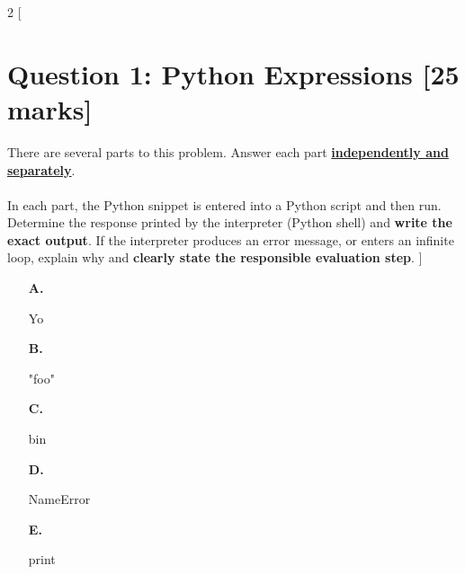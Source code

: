 \begin{multicols*}{2}
[
\section{Question 1: Python Expressions [25 marks]}
There are several parts to this problem. Answer each part \underline{\textbf{independently and separately}}. \\ \\
In each part, the Python snippet is entered into a Python script and then run. Determine the
response printed by the interpreter (Python shell) and \textbf{write the exact output}. 
If the interpreter produces an error message, or enters an infinite loop, explain why and
\textbf{clearly state the responsible evaluation step}.
]
\begin{enumerate}
\item[\textbf{A.}] 
\begin{python}
Yo
\end{python}
\begin{flushright}
    [5 marks]
\end{flushright}

\item[\textbf{B.}]
\begin{python}
"foo"
\end{python}
\begin{flushright}
    [5 marks]
\end{flushright}

\item[\textbf{C.}]
\begin{python}
bin
\end{python}
\begin{flushright}
    [5 marks]
\end{flushright}

\item[\textbf{D.}]
\begin{python}
NameError
\end{python}
\begin{flushright}
    [5 marks]
\end{flushright}

\item[\textbf{E.}]
\begin{python}
print
\end{python}
\begin{flushright}
    [5 marks]
\end{flushright}
\end{enumerate}
\end{multicols*}

